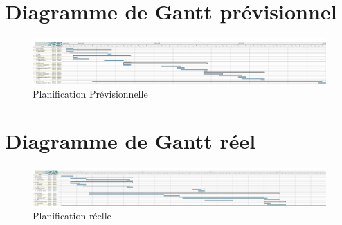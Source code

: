 \documentclass{report}
\begin{document}
\appendix
\chapter{Diagramme de Gantt prévisionnel}
	\begin{figure}
		 \hspace{-4cm} 
			\includegraphics[scale=0.3]{../DiagrammePrevisionnel.png}
			\caption[Planification Prévisionnelle]{Planification Prévisionnelle}
	\end{figure}
	\medskip


\chapter{Diagramme de Gantt réel}
	\begin{figure}
		 \hspace{-4cm} 
			\includegraphics[scale=0.3]{../Rapport-Latex/imagesRapport/DiagrammeReel.png}
			\caption[Planification réelle]{Planification réelle}
	\end{figure}
	\medskip
\end{document}
